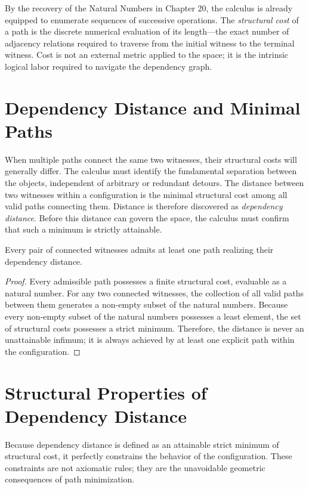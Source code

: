 \documentclass[12pt,anyside]{book}
\newcommand{\term}[1]{\textit{#1}}             %
\begin{document}
By the recovery of the Natural Numbers in Chapter 20, the calculus is already equipped to enumerate sequences of successive operations. The \term{structural cost} of a path is the discrete numerical evaluation of its length---the exact number of adjacency relations required to traverse from the initial witness to the terminal witness. Cost is not an external metric applied to the space; it is the intrinsic logical labor required to navigate the dependency graph.

\section{Dependency Distance and Minimal Paths}
When multiple paths connect the same two witnesses, their structural costs will generally differ. The calculus must identify the fundamental separation between the objects, independent of arbitrary or redundant detours. The distance between two witnesses within a configuration is the minimal structural cost among all valid paths connecting them. Distance is therefore discovered as \term{dependency distance}. Before this distance can govern the space, the calculus must confirm that such a minimum is strictly attainable.

\begin{theorem}
Every pair of connected witnesses admits at least one path realizing their dependency distance.
\end{theorem}

\begin{proof}
Every admissible path possesses a finite structural cost, evaluable as a natural number. For any two connected witnesses, the collection of all valid paths between them generates a non-empty subset of the natural numbers. Because every non-empty subset of the natural numbers possesses a least element, the set of structural costs possesses a strict minimum. Therefore, the distance is never an unattainable infimum; it is always achieved by at least one explicit path within the configuration.
\end{proof}

\section{Structural Properties of Dependency Distance}
Because dependency distance is defined as an attainable strict minimum of structural cost, it perfectly constrains the behavior of the configuration. These constraints are not axiomatic rules; they are the unavoidable geometric consequences of path minimization.
\end{document}
